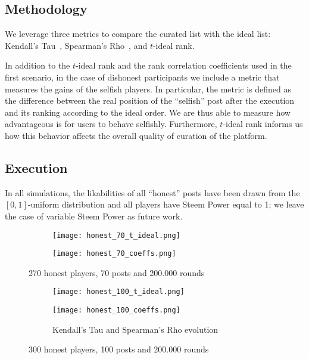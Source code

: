 \documentclass[a4paper,english,cleveref, autoref]{oasics-v2019}
\begin{document}
  \subsection{Methodology}
    We leverage three metrics to compare the curated list with the ideal list:
    Kendall's Tau~\cite{kendall1955rank}, Spearman's
    Rho~\cite{spearman1904proof}, and $t$-ideal rank.

    In addition to the $t$-ideal rank and the rank correlation coefficients used
    in the first scenario, in the case of dishonest participants we include a
    metric that measures the gains of the selfish players. In particular, the
    metric is defined as the difference between the real position of the
    ``selfish'' post after the execution and its ranking according to the ideal
    order. We are thus able to measure how advantageous is for users to behave
    selfishly. Furthermore, $t$-ideal rank informs us how this behavior affects
    the overall quality of curation of the platform.

  \subsection{Execution}
    In all simulations, the likabilities of all ``honest'' posts have been drawn
    from the $\left[0, 1\right]$-uniform distribution and all players have Steem
    Power equal to 1; we leave the case of variable Steem Power as future work.

    \begin{figure}[ht]
      \begin{subfigure}[t]{0.5\textwidth}
        \centering
        \texttt{[image: honest\_70\_t\_ideal.png]}
        \label{fig:honest:70:tideal}
      \end{subfigure}\hfill
      \begin{subfigure}[t]{0.5\textwidth}
        \centering
        \texttt{[image: honest\_70\_coeffs.png]}
        \label{fig:honest:70:coeffs}
      \end{subfigure}
      \caption{270 honest players, 70 posts and 200.000 rounds}
    \end{figure}

    \begin{figure}[ht]
      \begin{subfigure}[t]{0.5\textwidth}
        \centering
        \texttt{[image: honest\_100\_t\_ideal.png]}
        \label{fig:honest:100:tideal}
      \end{subfigure}\hfill
      \begin{subfigure}[t]{0.5\textwidth}
        \centering
        \texttt{[image: honest\_100\_coeffs.png]}
        \caption{Kendall's Tau and Spearman's Rho evolution}
        \label{fig:honest:100:coeffs}
      \end{subfigure}
      \caption{300 honest players, 100 posts and 200.000 rounds}
    \end{figure}
\end{document}
